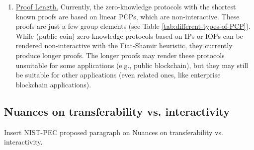 \begin{enumerate}
\item \underline{Proof Length.} Currently, the zero-knowledge protocols with the shortest known proofs are based on linear PCPs, which are non-interactive. These proofs are just a few group elements (see Table \ref{tab:different-types-of-PCP}). While (public-coin) zero-knowledge protocols based on IPs or IOPs can be rendered non-interactive with the Fiat-Shamir heuristic, they currently produce longer proofs. The longer proofs may render these protocols unsuitable for some applications (e.g., public blockchain), but they may still be suitable for other applications (even related ones, like enterprise blockchain applications).


\end{enumerate}

\subsection{Nuances on transferability vs. interactivity}
\label{section:transferability-deniability-interactivity}
{\color{red} Insert NIST-PEC proposed paragraph on Nuances on transferability vs. interactivity.}
